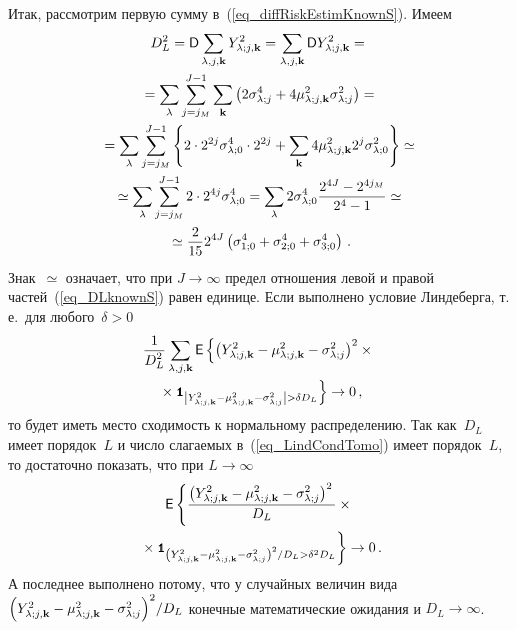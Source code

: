 \begin{multicols}{2}
Итак, рассмотрим первую сумму в~(\ref{eq_diffRiskEstimKnownS}). Имеем
\begin{multline}
D_L^2 = {\sf D}\sum\limits_{\lambda,j,\mathbf{k}}Y_{\lambda;j,\mathbf{k}}^2 = \sum\limits_{\lambda,j,\mathbf{k}} {\sf D} Y_{\lambda;j,\mathbf{k}}^2={}\\
{}=\sum\limits_\lambda \sum_{j=j_M}^{J-1} \sum_{\mathbf{k}}
\left( 2\sigma_{\lambda;j}^4 + 4\mu_{\lambda;j,\mathbf{k}}^2\sigma_{\lambda;j}^2 \right)={}\\
{}= \sum\limits_\lambda \sum_{j=j_M}^{J-1}\left\{ 2\cdot 2^{2j}
\sigma_{\lambda;0}^4 \cdot 2^{2j} + \sum_{\mathbf{k}}4\mu_{\lambda;j,\mathbf{k}}^2 2^j \sigma_{\lambda;0}^2 \right\} \simeq{}\\
{}\simeq \sum\limits_\lambda \sum_{j=j_M}^{J-1} 2\cdot 2^{4j}
\sigma_{\lambda;0}^4 = \sum\limits_\lambda 2\sigma_{\lambda;0}^4 \frac{2^{4J} - 2^{4j_M}}{2^4 - 1} \simeq{}\\
{}\simeq \displaystyle\frac{\displaystyle 2\mathstrut}{\displaystyle 15\mathstrut} 2^{4J} \left( \sigma_{1;0}^4 + \sigma_{2;0}^4 + \sigma_{3;0}^4 \right)\,.
\label{eq_DLknownS}
\end{multline}
Знак~$\simeq$ означает, что при $J\rightarrow\infty$ предел отношения левой и правой частей~(\ref{eq_DLknownS}) 
равен единице. Если выполнено условие Линдеберга, т.\,е.\ для любого~$\delta>0$
\begin{multline}
\fr{1}{D_L^2}\sumljk\e\left\{ \left( \Yljk^2 - \muljk^2 - \slj \right)^2\times{}\right.\\
\left.{}\times \Ik_{\left|\Yljk^2 - \muljk^2 - \slj\right|>\delta D_L} \right\} \rightarrow 0\,,
\label{eq_LindCondTomo}
\end{multline}
то будет иметь место сходимость к нормальному распределению. Так как~$D_L$ имеет порядок~$L$ и чис\-ло слагаемых 
в~(\ref{eq_LindCondTomo}) имеет порядок~$L$, то достаточно показать, что при $L\rightarrow\infty$
\begin{multline*}
{\sf E}\left\{ \displaystyle\frac{\displaystyle \left( Y_{\lambda;j,\mathbf{k}}^2 - \mu_{\lambda;j,\mathbf{k}}^2 - \sigma_{\lambda;j}^2 \right)^2\mathstrut}{\displaystyle D_L\mathstrut} \times{}\right.\\
\left.{}\times\mbox{{\small \tt {1}}\hspace{-1.5mm}{\tt 1}}_{\left(Y_{\lambda;j,\mathbf{k}}^2 - \mu_{\lambda;j,\mathbf{k}}^2 - \sigma_{\lambda;j}^2\right)^2/D_L>\delta^2 D_L} \right\} \rightarrow 0\,.
\end{multline*}
А последнее выполнено потому, что у случайных величин вида $\left( Y_{\lambda;j,\mathbf{k}}^2 - \mu_{\lambda;j,\mathbf{k}}^2 - \sigma_{\lambda;j}^2 \right)^2\!/D_L$ 
конечные математические ожидания и $D_L\rightarrow\infty$.


\end{multicols}
